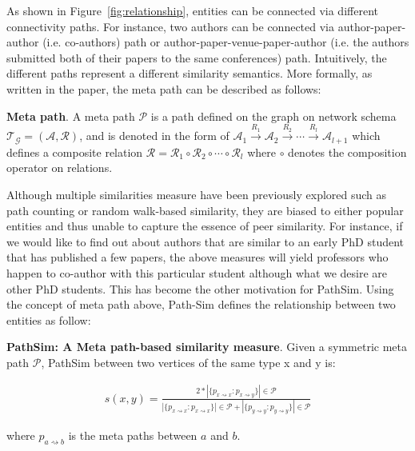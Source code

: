As shown in Figure~\ref{fig:relationship}, entities can be connected via
different connectivity paths. For instance, two authors can be connected via
author-paper-author (i.e. co-authors) path or author-paper-venue-paper-author
(i.e.  the authors submitted both of their papers to the same conferences)
path. Intuitively, the different paths represent a different similarity
semantics. More formally, as written in the paper, the meta path can be
described as follows:

\begin{Def}
\label{meta path}
\textbf{Meta path}. A meta path $\mathcal{P}$ is a path defined on the graph on
network schema $\mathcal{T_G} = \mathcal{(A, R)}$, and is denoted in the form
of $\mathcal{A}_1 \xrightarrow{R_1} \mathcal{A}_2 \xrightarrow{R_2} \cdots
\xrightarrow{R_l} \mathcal{A}_{l + 1}$ which defines a composite relation
$\mathcal{R} = \mathcal{R}_1 \circ \mathcal{R}_2 \circ \cdots \circ
\mathcal{R}_l$ where $\circ$ denotes the composition operator on relations. \newline
\end{Def}

Although multiple similarities measure have been previously explored such as
path counting or random walk-based similarity, they are biased to either
popular entities and thus unable to capture the essence of peer similarity.
For instance, if we would like to find out about authors that are similar to
an early PhD student that has published a few papers, the above measures
will yield professors who happen to co-author with this particular student
although what we desire are other PhD students. This has become the other
motivation for PathSim. Using the concept of meta path above, Path-Sim
defines the relationship between two entities as follow: \newline

\begin{Def}
\label{path-sim}
\textbf{PathSim: A Meta path-based similarity measure}. Given a symmetric
meta path $\mathcal{P}$, PathSim between two vertices of the same type
x and y is:

\begin{align*}
s(x,y)=\frac{2*|\{p_{x \rightsquigarrow x}:p_{x \rightsquigarrow y}\}|\in\mathcal{P}}
{|\{p_{x \rightsquigarrow x}:p_{x \rightsquigarrow x}\}|\in\mathcal{P} +
|\{p_{y \rightsquigarrow y}:p_{y \rightsquigarrow y}\}|\in\mathcal{P}}
\end{align*}

where $p_{a \rightsquigarrow b}$ is the meta paths between $a$ and $b$. \newline
\end{Def}

